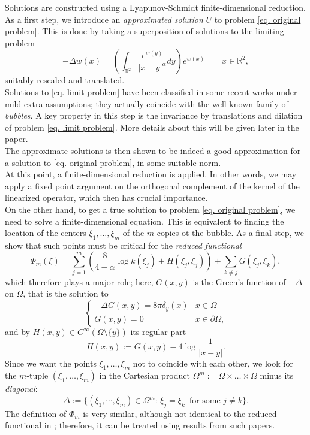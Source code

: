 \documentclass[11pt]{article}
\begin{document}
Solutions are constructed using a Lyapunov-Schmidt finite-dimensional reduction.\\
As a first step, we introduce an \emph{approximated solution} $U$ to problem \eqref{eq. original problem}. This is done by taking a superposition of solutions to the limiting problem
\begin{equation}\label{eq. limit problem}
-\Delta w(x)=\left(\int_{\mathbb R^2}\frac{e^{w(y)}}{|x-y|^\alpha}dy\right)e^{w(x)}\qquad x\in\mathbb R^2,
\end{equation}
suitably rescaled and translated.\\
Solutions to \eqref{eq. limit problem} have been classified in some recent works \cite{guopeng_2024,niu,gluck,yangyu} under mild extra assumptions; they actually coincide with the well-known family of \emph{bubbles}. A key property in this step is the invariance by translations and dilation of problem \eqref{eq. limit problem}. More details about this will be given later in the paper.\\
The approximate solutions is then shown to be indeed a good approximation for a solution to \eqref{eq. original problem}, in some suitable norm.\\

At this point, a finite-dimensional reduction is applied. In other words, we may apply a fixed point argument on the orthogonal complement of the kernel of the linearized operator, which then	 has crucial importance.\\
On the other hand, to get a true solution to problem \eqref{eq. original problem}, we need to solve a finite-dimensional equation. This is equivalent to finding the location of the centers $\xi_1,\dots,\xi_m$ of the $m$ copies ot the bubble. As a final step, we show that such points must be critical for the \emph{reduced functional}
\begin{equation}\label{phi}
\boxed{\Phi_m(\xi)=\sum_{j=1}^m\left(\frac8{4-\alpha}\log k(\xi_j)+H(\xi_j,\xi_j)\right)+\sum_{k\ne j}G(\xi_j,\xi_k),}
\end{equation}
which therefore plays a major role; here, $G(x,y)$ is the Green's function of $-\Delta$ on $\Omega$, that is the solution to
$$\left\{\begin{array}{ll}-\Delta G(x,y)=8\pi\delta_y(x)&x\in\Omega\\G(x,y)=0&x\in\partial\Omega,\end{array}\right.$$
and by $H(x,y)\in C^\infty\left(\Omega\setminus\{y\}\right)$ its regular part
\begin{equation}\label{regular part}
H(x,y):=G(x,y)-4\log\frac1{|x-y|}.
\end{equation}
Since we want the points $\xi_1,\dots,\xi_m$ not to coincide with each other, we look for the $m$-tuple $(\xi_1,\dots,\xi_m)$ in the Cartesian product $\Omega^m:=\Omega\times\dots \times\Omega$ minus its \emph{diagonal}:
$$\Delta:=\{(\xi_1,\cdots,\xi_m)\in\Omega^m:\,\xi_j=\xi_k\,\text{ for some }j\ne k\}.$$
The definition of $\Phi_m$ is very similar, although not identical to the reduced functional in \cite{dkm,esp}; therefore, it can be treated using results from such papers.\\
\end{document}

